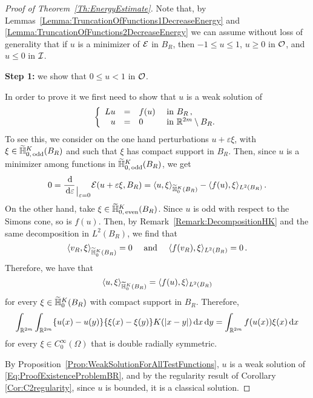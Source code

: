 \begin{proof}[Proof of Theorem~\ref{Th:EnergyEstimate}]

Note that, by Lemmas~\ref{Lemma:TruncationOfFunctions1DecreaseEnergy} and \ref{Lemma:TruncationOfFunctions2DecreaseEnergy} we can assume without loss of generality that if $u$ is a minimizer of $\mathcal{E}$ in $B_R$, then $-1 \leq u \leq 1$, $u \geq 0$ in $\mathcal{O}$, and $u \leq 0$ in $\mathcal{I}$. 

\textbf{Step 1:} we show that $0\leq u < 1$ in $\mathcal{O}$. 

In order to prove it we first need to show that $u$ is a weak solution of
\begin{equation}
\label{Eq:ProofExistenceProblemBR}
	\left\{\begin{array}{rcll}
	L u &=& f(u) & \textrm{ in } B_R\,,\\
	u &=& 0 & \textrm{ in }\mathbb{R}^{2m} \setminus B_R.
	\end{array} \right.
\end{equation}
To see this, we consider on the one hand perturbations $u +  \varepsilon \xi$, with $\xi \in \widetilde{\mathbb{H}}^K_{0, \,\mathrm{odd}}(B_R)$ and such that $\xi$ has compact support in $B_R$. Then, since $u$ is a minimizer among functions in $\widetilde{\mathbb{H}}^K_{0, \,\mathrm{odd}}(B_R)$, we get
$$
0 = \dfrac{\,\mathrm{d}}{\,\mathrm{d} \varepsilon}_{\mkern1.5mu\big\vert_{\scriptstyle \varepsilon = 0}} \mathcal{E}(u +  \varepsilon \xi, B_R) = \langle u,\xi \rangle_{\widetilde{\mathbb{H}}^K_0(B_R)} - \langle f(u),\xi \rangle_{L^2(B_R)}\,.
$$
On the other hand, take $\xi \in \widetilde{\mathbb{H}}^K_{0, \,\mathrm{even}}(B_R)$. Since $u$ is odd with
respect to the Simons cone, so is $f(u)$. Then, by Remark~\ref{Remark:DecompositionHK} and the same
decomposition in $L^2(B_R)$, we find that
$$
\langle v_R,\xi \rangle_{\widetilde{\mathbb{H}}^K_0(B_R)} = 0 \quad \textrm{ and } \quad  \langle f(v_R),\xi \rangle_{L^2(B_R)} = 0\,.
$$
Therefore, we have that
$$
\langle u,\xi \rangle_{\widetilde{\mathbb{H}}^K_0(B_R)} = \langle f(u),\xi \rangle_{L^2(B_R)}
$$
for every $\xi \in\widetilde{\mathbb{H}}^K_0(B_R)$ with compact support in  $B_R$. Therefore,
$$
\int_{\mathbb{R}^{2m}}\int_{\mathbb{R}^{2m}} \{u(x)-u(y)\}\{\xi(x)-\xi(y)\} K(|x-y|) \,\mathrm{d} x \,\mathrm{d} y = \int_{\mathbb{R}^{2m}} f(u(x)) \xi(x) \,\mathrm{d} x
$$
for every $\xi \in C^\infty_0(\Omega)$ that is double radially symmetric.

By Proposition~\ref{Prop:WeakSolutionForAllTestFunctions}, $u$ is a weak solution of \eqref{Eq:ProofExistenceProblemBR}, and by the regularity result of Corollary \ref{Cor:C2regularity}, since $u$ is bounded, it is a classical solution.


\end{proof}
